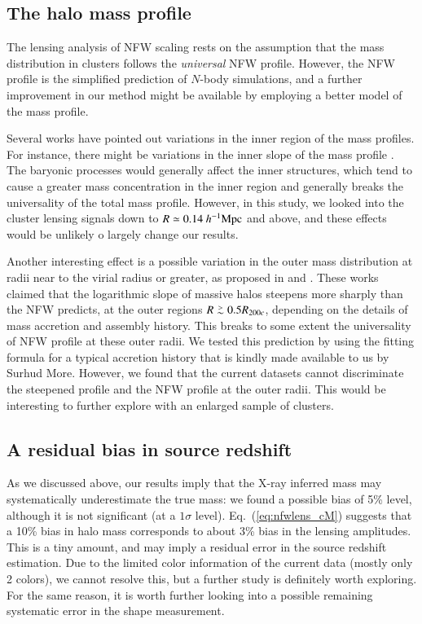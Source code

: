 \documentclass[iop, apj]{emulateapj}
\newcommand{\simgt}{\lower.5ex\hbox{$\; \buildrel > \over \sim \;$}}
\newcommand{\?}{\stackrel{?}{=}}
\begin{document}
\subsection{The halo mass profile}

The lensing analysis of NFW scaling rests on the assumption that the
mass distribution in clusters follows the {\it universal} NFW
profile. However, the NFW profile is the simplified prediction of
$N$-body simulations, and a further improvement in our method might be
available by employing a better model of the mass profile.

Several works have pointed out variations in the inner region of the
mass profiles. For instance, there might be variations in the inner
slope of the mass profile \citep[e.g., see][and references
therein]{Navarroetal:04}. The baryonic processes would generally affect
the inner structures, which tend to cause a greater mass concentration
in the inner region and generally breaks the universality of the total
mass profile. However, in this study, we looked into the cluster lensing
signals down to $R\simeq 0.14~h^{-1}{\rm Mpc}$ and above, and these
effects would be unlikely o largely change our results.

Another interesting effect is a possible variation in the outer mass
distribution at radii near to the virial radius or greater, as proposed
in \citet{DiemerKravtsov:14b} and \citet{Adhikarietal:14}. These works
claimed that the logarithmic slope of massive halos steepens more
sharply than the NFW predicts, at the outer regions $R\simgt
0.5R_{200c}$, depending on the details of mass accretion and assembly
history. This breaks to some extent the universality of NFW profile at
these outer radii. We tested this prediction by using the fitting
formula for a typical accretion history that is kindly made available to
us by Surhud More. However, we found that the current datasets cannot
discriminate the steepened profile and the NFW profile at the outer
radii. This would be interesting to further explore with an enlarged
sample of clusters.



\subsection{A residual bias in source redshift}

As we discussed above, our results imply that the X-ray inferred mass
may systematically underestimate the true mass: we found a possible bias
of 5\% level, although it is not significant (at a $1\sigma$
level).  Eq.~(\ref{eq:nfwlens_cM}) suggests that a 10\% bias in halo
mass corresponds to about 3\% bias in the lensing amplitudes. This is a
tiny amount, and may imply a residual error in the source redshift
estimation.
Due to the limited color information of
the current data (mostly only 2 colors), we cannot resolve this, but a
further study is definitely worth exploring. For the same reason, it is
worth further looking into a possible remaining systematic error in the
shape measurement.
\end{document}
